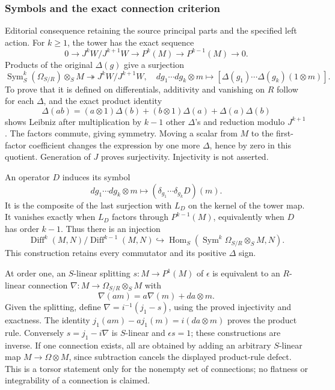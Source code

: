 \subsubsection{Symbols and the exact connection criterion}\label{algebra-proof-043-symbols-and-the-exact-connection-criterion}

Editorial consequence retaining the source principal parts and the specified left action. For \(k\ge1\), the tower has the exact sequence \[
0\longrightarrow J^kW/J^{k+1}W\longrightarrow P^k(M)\longrightarrow P^{k-1}(M)\longrightarrow0.
\] Products of the original \(\Delta(g)\) give a surjection \[
\operatorname{Sym}^k_S(\Omega_{S/R})\otimes_SM\twoheadrightarrow J^kW/J^{k+1}W,
\quad dg_1\cdots dg_k\otimes m\longmapsto[\Delta(g_1)\cdots\Delta(g_k)(1\otimes m)].
\] To prove that it is defined on differentials, additivity and vanishing on \(R\) follow for each \(\Delta\), and the exact product identity \[
\Delta(ab)=(a\otimes1)\Delta(b)+(b\otimes1)\Delta(a)+\Delta(a)\Delta(b)
\] shows Leibniz after multiplication by \(k-1\) other \(\Delta\)'s and reduction modulo \(J^{k+1}\). The factors commute, giving symmetry. Moving a scalar from \(M\) to the first-factor coefficient changes the expression by one more \(\Delta\), hence by zero in this quotient. Generation of \(J\) proves surjectivity. Injectivity is not asserted.

An operator \(D\) induces its symbol \[
dg_1\cdots dg_k\otimes m\longmapsto(\delta_{g_1}\cdots\delta_{g_k}D)(m).
\] It is the composite of the last surjection with \(L_D\) on the kernel of the tower map. It vanishes exactly when \(L_D\) factors through \(P^{k-1}(M)\), equivalently when \(D\) has order \(k-1\). Thus there is an injection \[
\operatorname{Diff}^k(M,N)/\operatorname{Diff}^{k-1}(M,N)
\hookrightarrow\operatorname{Hom}_S(\operatorname{Sym}^k\Omega_{S/R}\otimes_SM,N).
\] This construction retains every commutator and its positive \(\Delta\) sign.

At order one, an \(S\)-linear splitting \(s:M\to P^1(M)\) of \(\epsilon\) is equivalent to an \(R\)-linear connection \(\nabla:M\to\Omega_{S/R}\otimes_SM\) with \[
\nabla(am)=a\nabla(m)+da\otimes m.
\] Given the splitting, define \(\nabla=i^{-1}(j_1-s)\), using the proved injectivity and exactness. The identity \(j_1(am)-a j_1(m)=i(da\otimes m)\) proves the product rule. Conversely \(s=j_1-i\nabla\) is \(S\)-linear and \(\epsilon s=1\); these constructions are inverse. If one connection exists, all are obtained by adding an arbitrary \(S\)-linear map \(M\to\Omega\otimes M\), since subtraction cancels the displayed product-rule defect. This is a torsor statement only for the nonempty set of connections; no flatness or integrability of a connection is claimed.

